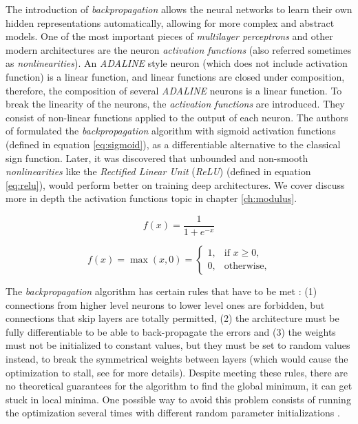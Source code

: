 The introduction of \textit{backpropagation} allows the neural networks to learn their own hidden representations automatically, allowing for more complex and abstract models. One of the most important pieces of \textit{multilayer perceptrons} and other modern architectures are the neuron \textit{activation functions} (also referred sometimes as \textit{nonlinearities}). An \textit{ADALINE} style neuron (which does not include activation function) is a linear function, and linear functions are closed under composition, therefore, the composition of several \textit{ADALINE} neurons is a linear function. To break the linearity of the neurons, the \textit{activation functions} are introduced. They consist of non-linear functions applied to the output of each neuron. The authors of \autocite{hinton1986} formulated the \textit{backpropagation} algorithm with sigmoid activation functions (defined in equation \ref{eq:sigmoid}), as a differentiable alternative to the classical sign function. Later, it was discovered that unbounded and non-smooth \textit{nonlinearities} like the \textit{Rectified Linear Unit} (\textit{ReLU}) \autocite{nair2010} (defined in equation \ref{eq:relu}), would perform better on training deep architectures. We cover discuss more in depth the activation functions topic in chapter \ref{ch:modulus}.


\begin{equation}
\label{eq:sigmoid}
f(x) = \frac{1}{1+e^{-x}}
\end{equation}

\begin{equation}
\label{eq:relu}
f(x) = \max(x, 0) =
\begin{cases}
1,          & \text{if } x \geq 0 ,\\
0,         & \text{otherwise},
\end{cases}
\end{equation}

The \textit{backpropagation} algorithm has certain rules that have to be met \autocite{hinton1986}: (1) connections from higher level neurons to lower level ones are forbidden, but connections that skip layers are totally permitted, (2) the architecture must be fully differentiable to be able to back-propagate the errors and (3) the weights must not be initialized to constant values, but they must be set to random values instead, to break the symmetrical weights between layers (which would cause the optimization to stall, see \autocite{hinton1986} for more details). Despite meeting these rules, there are no theoretical guarantees for the algorithm to find the global minimum, it can get stuck in local minima. One possible way to avoid this problem consists of running the optimization several times with different random parameter initializations \autocite{haykin1998}.

